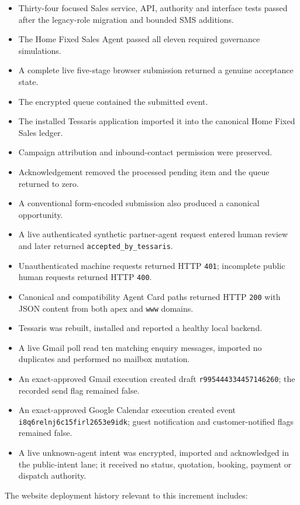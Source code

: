 \begin{itemize}
  \item Thirty-four focused Sales service, API, authority and interface tests passed after the legacy-role migration and bounded SMS additions.
  \item The Home Fixed Sales Agent passed all eleven required governance simulations.
  \item A complete live five-stage browser submission returned a genuine acceptance state.
  \item The encrypted queue contained the submitted event.
  \item The installed Tessaris application imported it into the canonical Home Fixed Sales ledger.
  \item Campaign attribution and inbound-contact permission were preserved.
  \item Acknowledgement removed the processed pending item and the queue returned to zero.
  \item A conventional form-encoded submission also produced a canonical opportunity.
  \item A live authenticated synthetic partner-agent request entered human review and later returned \texttt{accepted\_by\_tessaris}.
  \item Unauthenticated machine requests returned HTTP \texttt{401}; incomplete public human requests returned HTTP \texttt{400}.
  \item Canonical and compatibility Agent Card paths returned HTTP \texttt{200} with JSON content from both apex and \texttt{www} domains.
  \item Tessaris was rebuilt, installed and reported a healthy local backend.
  \item A live Gmail poll read ten matching enquiry messages, imported no duplicates and performed no mailbox mutation.
  \item An exact-approved Gmail execution created draft \texttt{r995444334457146260}; the recorded send flag remained false.
  \item An exact-approved Google Calendar execution created event \texttt{i8q6relnj6c15firl2653e9idk}; guest notification and customer-notified flags remained false.
  \item A live unknown-agent intent was encrypted, imported and acknowledged in the public-intent lane; it received no status, quotation, booking, payment or dispatch authority.
\end{itemize}

The website deployment history relevant to this increment includes:


